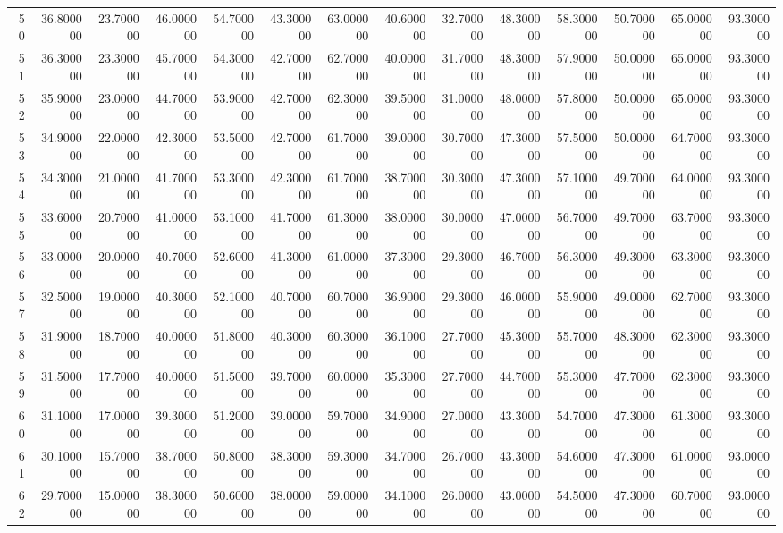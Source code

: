 \begin{tabular}{rrrrrrrrrrrrrr}
50 & 36.800000 & 23.700000 & 46.000000 & 54.700000 & 43.300000 & 63.000000 & 40.600000 & 32.700000 & 48.300000 & 58.300000 & 50.700000 & 65.000000 & 93.300000 \\
51 & 36.300000 & 23.300000 & 45.700000 & 54.300000 & 42.700000 & 62.700000 & 40.000000 & 31.700000 & 48.300000 & 57.900000 & 50.000000 & 65.000000 & 93.300000 \\
52 & 35.900000 & 23.000000 & 44.700000 & 53.900000 & 42.700000 & 62.300000 & 39.500000 & 31.000000 & 48.000000 & 57.800000 & 50.000000 & 65.000000 & 93.300000 \\
53 & 34.900000 & 22.000000 & 42.300000 & 53.500000 & 42.700000 & 61.700000 & 39.000000 & 30.700000 & 47.300000 & 57.500000 & 50.000000 & 64.700000 & 93.300000 \\
54 & 34.300000 & 21.000000 & 41.700000 & 53.300000 & 42.300000 & 61.700000 & 38.700000 & 30.300000 & 47.300000 & 57.100000 & 49.700000 & 64.000000 & 93.300000 \\
55 & 33.600000 & 20.700000 & 41.000000 & 53.100000 & 41.700000 & 61.300000 & 38.000000 & 30.000000 & 47.000000 & 56.700000 & 49.700000 & 63.700000 & 93.300000 \\
56 & 33.000000 & 20.000000 & 40.700000 & 52.600000 & 41.300000 & 61.000000 & 37.300000 & 29.300000 & 46.700000 & 56.300000 & 49.300000 & 63.300000 & 93.300000 \\
57 & 32.500000 & 19.000000 & 40.300000 & 52.100000 & 40.700000 & 60.700000 & 36.900000 & 29.300000 & 46.000000 & 55.900000 & 49.000000 & 62.700000 & 93.300000 \\
58 & 31.900000 & 18.700000 & 40.000000 & 51.800000 & 40.300000 & 60.300000 & 36.100000 & 27.700000 & 45.300000 & 55.700000 & 48.300000 & 62.300000 & 93.300000 \\
59 & 31.500000 & 17.700000 & 40.000000 & 51.500000 & 39.700000 & 60.000000 & 35.300000 & 27.700000 & 44.700000 & 55.300000 & 47.700000 & 62.300000 & 93.300000 \\
60 & 31.100000 & 17.000000 & 39.300000 & 51.200000 & 39.000000 & 59.700000 & 34.900000 & 27.000000 & 43.300000 & 54.700000 & 47.300000 & 61.300000 & 93.300000 \\
61 & 30.100000 & 15.700000 & 38.700000 & 50.800000 & 38.300000 & 59.300000 & 34.700000 & 26.700000 & 43.300000 & 54.600000 & 47.300000 & 61.000000 & 93.000000 \\
62 & 29.700000 & 15.000000 & 38.300000 & 50.600000 & 38.000000 & 59.000000 & 34.100000 & 26.000000 & 43.000000 & 54.500000 & 47.300000 & 60.700000 & 93.000000 \\

\end{tabular}
